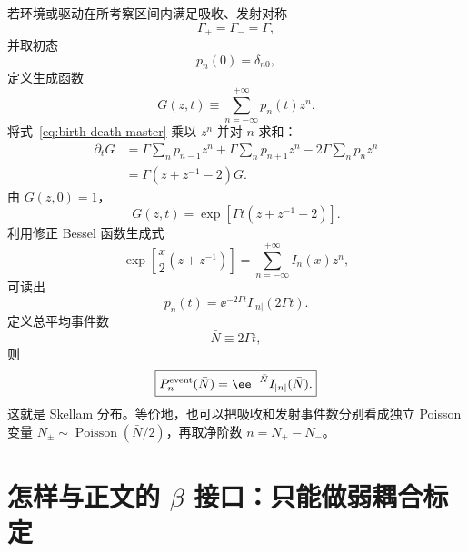 若环境或驱动在所考察区间内满足吸收、发射对称
\begin{equation}
\Gamma_+=\Gamma_-=\Gamma,
\label{eq:symmetric-event-rate}
\end{equation}
并取初态
\begin{equation}
p_n(0)=\delta_{n0},
\end{equation}
定义生成函数
\begin{equation}
G(z,t)\equiv\sum_{n=-\infty}^{+\infty}p_n(t)z^n.
\end{equation}
将式~\eqref{eq:birth-death-master} 乘以 \(z^n\) 并对 \(n\) 求和：
\begin{align}
\partial_tG
&=\Gamma\sum_n p_{n-1}z^n
+\Gamma\sum_n p_{n+1}z^n
-2\Gamma\sum_np_nz^n\\
&=\Gamma(z+z^{-1}-2)G.
\end{align}
由 \(G(z,0)=1\)，
\begin{equation}
G(z,t)
=\exp\!\left[\Gamma t(z+z^{-1}-2)\right].
\end{equation}
利用修正 Bessel 函数生成式
\begin{equation}
\exp\!\left[\frac{x}{2}(z+z^{-1})\right]
=\sum_{n=-\infty}^{+\infty}I_n(x)z^n,
\end{equation}
可读出
\begin{equation}
\boxed{
p_n(t)
=\ee^{-2\Gamma t}I_{|n|}(2\Gamma t).}
\label{eq:Skellam-time}
\end{equation}
定义总平均事件数
\begin{equation}
\bar N\equiv2\Gamma t,
\end{equation}
则
\begin{equation}
\boxed{
P_n^{\rm event}(\bar N)
=\ee^{-\bar N}I_{|n|}(\bar N).}
\label{eq:Skellam}
\end{equation}
这就是 Skellam 分布。等价地，也可以把吸收和发射事件数分别看成独立 Poisson 变量
\(
N_\pm\sim\operatorname{Poisson}(\bar N/2)
\)，再取净阶数 \(n=N_+-N_-\)。

\section{怎样与正文的 $\beta$ 接口：只能做弱耦合标定}

